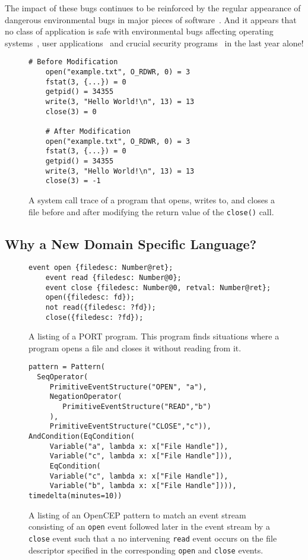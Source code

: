 The impact of these bugs continues to be reinforced by the regular
appearance of dangerous environmental bugs in major pieces of
software~\cite{devzeroroot}.  And it appears that no class of application
is safe with environmental bugs affecting operating
systems~\cite{ubuntuappaport},
user applications~\cite{westerndigitalsymlink} and crucial security
programs~\cite{sudocopy} in the
last year alone!

\begin{figure}
  \begin{lstlisting}[gobble=4]
    # Before Modification
    open("example.txt", O_RDWR, 0) = 3
    fstat(3, {...}) = 0
    getpid() = 34355
    write(3, "Hello World!\n", 13) = 13
    close(3) = 0

    # After Modification
    open("example.txt", O_RDWR, 0) = 3
    fstat(3, {...}) = 0
    getpid() = 34355
    write(3, "Hello World!\n", 13) = 13
    close(3) = -1
  \end{lstlisting}
  \caption{A system call trace of a program that opens, writes to, and closes
  a file before and after modifying the return value of the \texttt{close()} call.}
  \label{fig:StraceListing}
\end{figure}

\subsection{Why a New Domain Specific Language?}
\begin{figure}
  \begin{lstlisting}[gobble=4,xleftmargin=.8em]
    event open {filedesc: Number@ret};
    event read {filedesc: Number@0};
    event close {filedesc: Number@0, retval: Number@ret};
    open({filedesc: fd});
    not read({filedesc: ?fd});
    close({filedesc: ?fd});
  \end{lstlisting}
  \caption{A listing of a PORT program.  This program finds situations
  where a program opens a file and closes it without reading from it.}
  \label{fig:PORTListing}
\end{figure}



\begin{figure}
  \begin{lstlisting}
pattern = Pattern(
  SeqOperator(
     PrimitiveEventStructure("OPEN", "a"),
     NegationOperator(
        PrimitiveEventStructure("READ","b")
     ),
     PrimitiveEventStructure("CLOSE","c")),
AndCondition(EqCondition(
     Variable("a", lambda x: x["File Handle"]),
     Variable("c", lambda x: x["File Handle"])),
     EqCondition(
     Variable("c", lambda x: x["File Handle"]),
     Variable("b", lambda x: x["File Handle"]))),
timedelta(minutes=10))
  \end{lstlisting}
  \caption{
    A listing of an OpenCEP pattern to match an event stream consisting of
    an {\tt open} event followed later in the event stream by a {\tt close}
    event such
    that a no intervening {\tt read} event occurs
    on the file descriptor specified in the corresponding {\tt open}
    and {\tt close} events.
}
  \label{fig:OpenCEPListing}
\end{figure}


